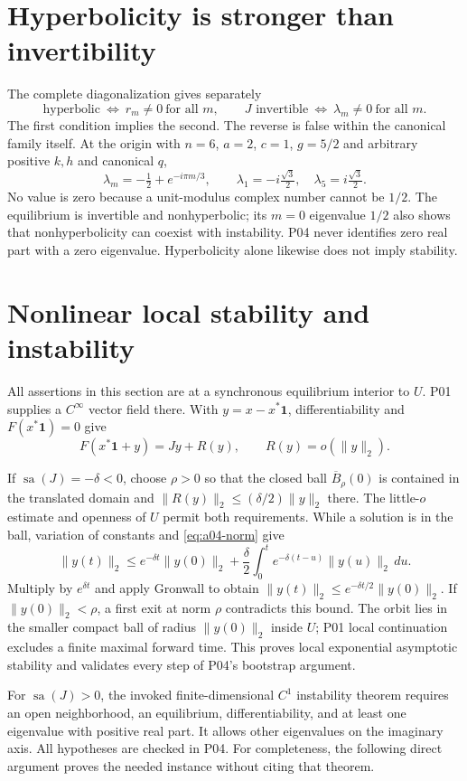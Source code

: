 \documentclass[11pt]{article}
\newcommand{\one}{\mathbf 1}
\newcommand{\sa}{\operatorname{sa}}
\begin{document}
\section{Hyperbolicity is stronger than invertibility}
The complete diagonalization gives separately
\[
 \text{hyperbolic}\ \Longleftrightarrow\ r_m\ne0\ \text{for all }m,
 \qquad J\text{ invertible}\ \Longleftrightarrow\ \lambda_m\ne0\ \text{for all }m.
\]
The first condition implies the second. The reverse is false within the
canonical family itself. At the origin with $n=6$, $a=2$, $c=1$, $g=5/2$
and arbitrary positive $k,h$ and canonical $q$,
\[
 \lambda_m=-\tfrac12+e^{-i\pi m/3},\qquad
 \lambda_1=-i\tfrac{\sqrt3}{2},\quad
 \lambda_5=i\tfrac{\sqrt3}{2}.
\]
No value is zero because a unit-modulus complex number cannot be $1/2$.
The equilibrium is invertible and nonhyperbolic; its $m=0$ eigenvalue
$1/2$ also shows that nonhyperbolicity can coexist with instability.
P04 never identifies zero real part with a zero eigenvalue. Hyperbolicity
alone likewise does not imply stability.

\section{Nonlinear local stability and instability}\label{sec:nonlinear}
All assertions in this section are at a synchronous equilibrium interior
to $U$. P01 supplies a $C^\infty$ vector field there. With
$y=x-x^*\one$, differentiability and $F(x^*\one)=0$ give
\[
 F(x^*\one+y)=Jy+R(y),\qquad R(y)=o(\|y\|_2).
\]

If $\sa(J)=-\delta<0$, choose $\rho>0$ so that the closed ball
$\overline B_\rho(0)$ is contained in the translated domain and
$\|R(y)\|_2\le(\delta/2)\|y\|_2$ there. The little-$o$ estimate and
openness of $U$ permit both requirements. While a solution is in the ball,
variation of constants and \eqref{eq:a04-norm} give
\[
 \|y(t)\|_2\le e^{-\delta t}\|y(0)\|_2+
 \frac\delta2\int_0^t e^{-\delta(t-u)}\|y(u)\|_2\,du.
\]
Multiply by $e^{\delta t}$ and apply Gronwall to obtain
$\|y(t)\|_2\le e^{-\delta t/2}\|y(0)\|_2$.
If $\|y(0)\|_2<\rho$, a first exit at norm $\rho$ contradicts this
bound. The orbit lies in the smaller compact ball of radius
$\|y(0)\|_2$ inside $U$; P01 local continuation excludes a finite maximal
forward time. This proves local exponential asymptotic stability and
validates every step of P04's bootstrap argument.

For $\sa(J)>0$, the invoked finite-dimensional $C^1$ instability theorem
requires an open neighborhood, an equilibrium, differentiability, and at
least one eigenvalue with positive real part. It allows other eigenvalues
on the imaginary axis. All hypotheses are checked in P04.
For completeness, the following direct argument proves the needed instance
without citing that theorem.
\end{document}
